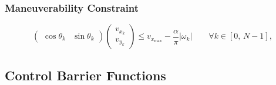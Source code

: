 \documentclass[main.tex]{subfiles}
\begin{document}
\subsubsection{Maneuverability Constraint}
\[
\begin{pmatrix}
\cos \theta_k & \sin \theta_k
\end{pmatrix}
\begin{pmatrix}
v_{x_k} \\
v_{y_k}
\end{pmatrix}
\leq v_{x_{\max}} - \frac{\alpha}{\pi} |\omega_k|
\qquad \forall k \in \left[0,\, N-1 \right],
\]

\subsection{Control Barrier Functions}
\end{document}
